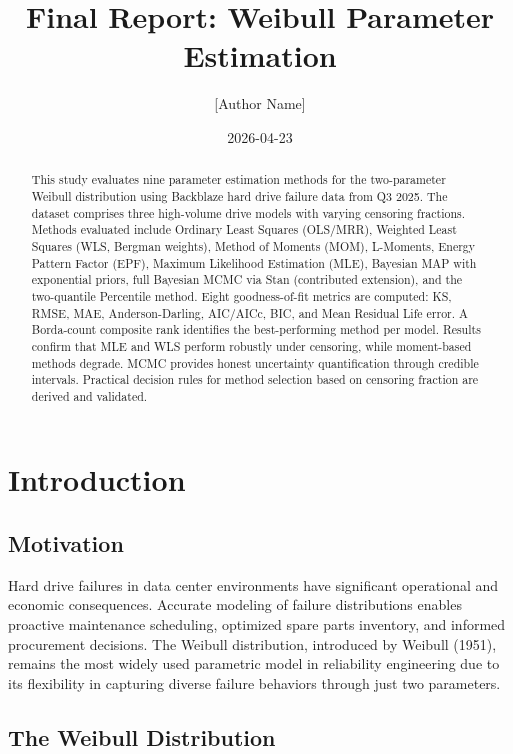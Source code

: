 \documentclass[
]{article}
\title{Final Report: Weibull Parameter Estimation}
\author{{[}Author Name{]}}
\date{2026-04-23}
\begin{document}
\maketitle
\begin{abstract}
This study evaluates nine parameter estimation methods for the
two-parameter Weibull distribution using Backblaze hard drive failure
data from Q3 2025. The dataset comprises three high-volume drive models
with varying censoring fractions. Methods evaluated include Ordinary
Least Squares (OLS/MRR), Weighted Least Squares (WLS, Bergman weights),
Method of Moments (MOM), L-Moments, Energy Pattern Factor (EPF), Maximum
Likelihood Estimation (MLE), Bayesian MAP with exponential priors, full
Bayesian MCMC via Stan (contributed extension), and the two-quantile
Percentile method. Eight goodness-of-fit metrics are computed: KS, RMSE,
MAE, Anderson-Darling, AIC/AICc, BIC, and Mean Residual Life error. A
Borda-count composite rank identifies the best-performing method per
model. Results confirm that MLE and WLS perform robustly under
censoring, while moment-based methods degrade. MCMC provides honest
uncertainty quantification through credible intervals. Practical
decision rules for method selection based on censoring fraction are
derived and validated.
\end{abstract}

{
\setcounter{tocdepth}{3}
\tableofcontents
}
\newpage

\section{Introduction}\label{introduction}

\subsection{Motivation}\label{motivation}

Hard drive failures in data center environments have significant
operational and economic consequences. Accurate modeling of failure
distributions enables proactive maintenance scheduling, optimized spare
parts inventory, and informed procurement decisions. The Weibull
distribution, introduced by Weibull (1951), remains the most widely used
parametric model in reliability engineering due to its flexibility in
capturing diverse failure behaviors through just two parameters.

\subsection{The Weibull Distribution}\label{the-weibull-distribution}
\end{document}
